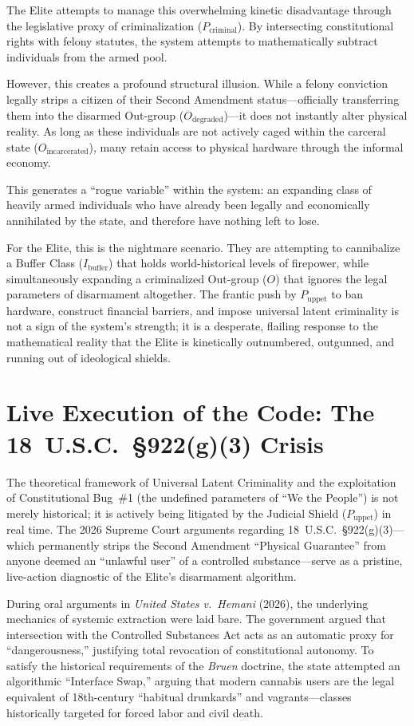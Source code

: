 \documentclass[12pt,openany]{book}
\begin{document}
The Elite attempts to manage this overwhelming kinetic disadvantage through the legislative proxy of criminalization ($P_{\text{criminal}}$). By intersecting constitutional rights with felony statutes, the system attempts to mathematically subtract individuals from the armed pool.

However, this creates a profound structural illusion. While a felony conviction legally strips a citizen of their Second Amendment status---officially transferring them into the disarmed Out-group ($O_{\text{degraded}}$)---it does not instantly alter physical reality. As long as these individuals are not actively caged within the carceral state ($O_{\text{incarcerated}}$), many retain access to physical hardware through the informal economy.

This generates a ``rogue variable'' within the system: an expanding class of heavily armed individuals who have already been legally and economically annihilated by the state, and therefore have nothing left to lose.

For the Elite, this is the nightmare scenario. They are attempting to cannibalize a Buffer Class ($I_{\text{buffer}}$) that holds world-historical levels of firepower, while simultaneously expanding a criminalized Out-group ($O$) that ignores the legal parameters of disarmament altogether. The frantic push by $P_{\text{uppet}}$ to ban hardware, construct financial barriers, and impose universal latent criminality is not a sign of the system's strength; it is a desperate, flailing response to the mathematical reality that the Elite is kinetically outnumbered, outgunned, and running out of ideological shields.

\section{Live Execution of the Code: The 18~U.S.C.~\S922(g)(3) Crisis}

The theoretical framework of Universal Latent Criminality and the exploitation of Constitutional Bug~\#1 (the undefined parameters of ``We the People'') is not merely historical; it is actively being litigated by the Judicial Shield ($P_{\text{uppet}}$) in real time. The 2026 Supreme Court arguments regarding 18~U.S.C.~\S922(g)(3)---which permanently strips the Second Amendment ``Physical Guarantee'' from anyone deemed an ``unlawful user'' of a controlled substance---serve as a pristine, live-action diagnostic of the Elite's disarmament algorithm.

During oral arguments in \textit{United States v.\ Hemani} (2026), the underlying mechanics of systemic extraction were laid bare. The government argued that intersection with the Controlled Substances Act acts as an automatic proxy for ``dangerousness,'' justifying total revocation of constitutional autonomy. To satisfy the historical requirements of the \textit{Bruen} doctrine, the state attempted an algorithmic ``Interface Swap,'' arguing that modern cannabis users are the legal equivalent of 18th-century ``habitual drunkards'' and vagrants---classes historically targeted for forced labor and civil death.
\end{document}
